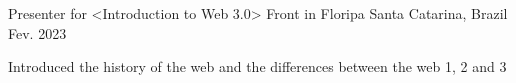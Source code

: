 

\begin{cventries}

  \cventry
    {Presenter for <Introduction to Web 3.0>} %
    {Front in Floripa} %
    {Santa Catarina, Brazil} %
    {Fev. 2023} %
    {
      \begin{cvitems} %
        \item {Introduced the history of the web and the differences between the web 1, 2 and 3}
      \end{cvitems}
    }
\end{cventries}
